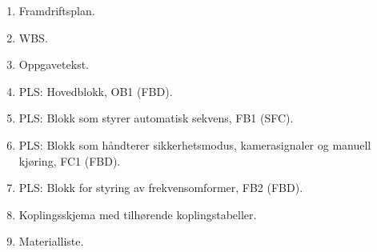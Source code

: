 \documentclass [12pt,norsk]{article}
\begin{document}
\begin{enumerate}[leftmargin=*, label={Vedlegg \Alph*}, align=left]
    \renewcommand{\theenumi}{\Alph{enumi}}
    \let\c\item\renewcommand{\item}[1]{\c\label{#1}}

     \item{ved:framdrift}			   Framdriftsplan. %
     \item{ved:wbs}					   WBS.            %
     \item{ved:oppgavetekst}		   Oppgavetekst.   %
     \item{ved:ob1}                    PLS: Hovedblokk, OB1 (FBD).           %
     \item{ved:sfc}					   PLS: Blokk som styrer automatisk sekvens, FB1 (SFC).    %
	\item{ved:hjelp}	               PLS: Blokk som håndterer sikkerhetsmodus, kamerasignaler og manuell kjøring, FC1 (FBD).  %
	\item{ved:frekvensomformerprogram} PLS: Blokk for styring av frekvensomformer, FB2 (FBD).  %
	\item{ved:skjema}	               Koplingsskjema med tilhørende koplingstabeller.         %
	\item{ved:materialliste}	       Materialliste.         %
\end{enumerate}
\end{document}
